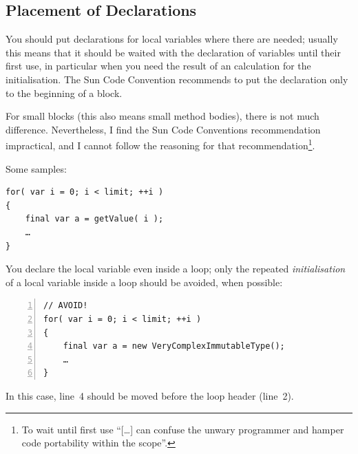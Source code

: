 \documentclass[11pt,a4paper, titlepage, parskip=half, headsepline, footsepline, cleardoublepage=current, headheight=1cm]{scrbook}
\begin{document}
\subsection{Placement of Declarations}
You should put declarations for local variables where there are needed; usually this means that it should be waited with the declaration of variables until their first use, in particular when you need the result of an calculation for the initialisation. The Sun Code Convention\autocite{SUN_CODE_CONVENTIONS:Placement} recommends to put the declaration only to the beginning of a block.

For small blocks (this also means small method bodies), there is not much difference. Nevertheless, I find the Sun Code Conventions recommendation impractical, and I cannot follow the reasoning for that recommendation\footnote{To wait until first use “[…] can confuse the unwary programmer and hamper code portability within the scope”.}.

Some samples:
\begin{lstlisting}
for( var i = 0; i < limit; ++i )
{
    final var a = getValue( i );
    …
}
\end{lstlisting}
You declare the local variable even inside a loop; only the repeated \textit{initialisation} of a local variable inside a loop should be avoided, when possible:
\begin{lstlisting}[numbers=left]
// AVOID!
for( var i = 0; i < limit; ++i )
{
    final var a = new VeryComplexImmutableType();
    …
}
\end{lstlisting}
In this case, line~4 should be moved before the loop header (line~2).
\end{document}
